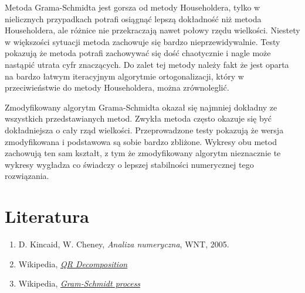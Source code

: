 \documentclass[11pt,wide]{mwart}
\begin{document}
Metoda Grama-Schmidta jest gorsza od metody Householdera, tylko w nielicznych przypadkach potrafi osiągnąć lepszą dokładność niż metoda Householdera, ale różnice nie przekraczają nawet połowy rzędu wielkości. Niestety w większości sytuacji metoda zachowuje się bardzo nieprzewidywalnie. Testy pokazują że metoda potrafi zachowywać się dość chaotycznie i nagle może nastąpić utrata cyfr znaczących. Do zalet tej metody należy fakt że jest oparta na bardzo łatwym iteracyjnym algorytmie ortogonalizacji, który w przeciwieństwie do metody Householdera, można zrównoleglić.

Zmodyfikowany algorytm Grama-Schmidta okazał się najmniej dokładny ze wszystkich przedstawianych metod. Zwykła metoda często okazuje się być dokładniejsza o cały rząd wielkości. Przeprowadzone testy pokazują że wersja zmodyfikowana i podstawowa są sobie bardzo zbliżone. Wykresy obu metod zachowują ten sam kształt, z tym że zmodyfikowany algorytm nieznacznie te wykresy wygładza co świadczy o lepszej stabilności numerycznej tego rozwiązania.

\section{Literatura}

\begin{enumerate}
	\item D. Kincaid, W. Cheney, \textit{Analiza numeryczna}, WNT, 2005.
	\item Wikipedia, \textit{\href{https://en.wikipedia.org/wiki/QR_decomposition}{QR Decomposition}}
	\item Wikipedia, \textit{\href{https://en.wikipedia.org/wiki/Gram\%E2\%80\%93Schmidt_process}{Gram-Schmidt process}} 
\end{enumerate}
\end{document}
